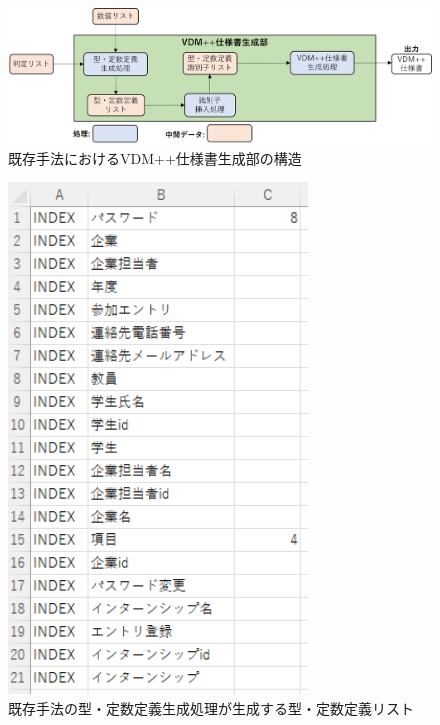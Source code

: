 \begin{figure}[tp]
    \begin{center}
        \includegraphics[width=1.0\columnwidth]{image/exis_generator_structure.png}
        \caption{既存手法におけるVDM++仕様書生成部の構造}
        \label{fig:exis_generator_structure}
    \end{center}
\end{figure}

\begin{figure}[tp]
    \begin{center}
        \includegraphics[width=300]{image/exis_katateisu_list.png}
        \caption{既存手法の型・定数定義生成処理が生成する型・定数定義リスト}
        \label{fig:exis_katateisu_list}
    \end{center}
\end{figure}

